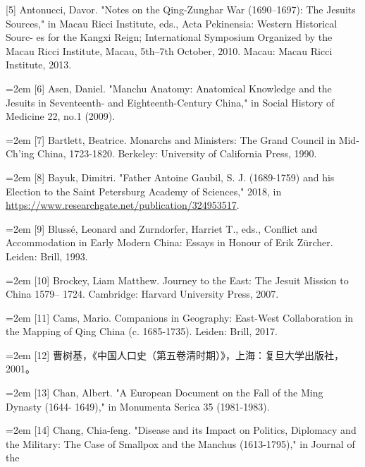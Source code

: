 [5] Antonucci, Davor. "Notes on the Qing-Zunghar War (1690–1697): The Jesuits%
\space%
Sources," in Macau Ricci Institute, eds., Acta Pekinensia: Western Historical Sourc-%
es for the Kangxi Reign; International Symposium Organized by the Macau Ricci%
\space%
Institute, Macau, 5th–7th October, 2010. Macau: Macau Ricci Institute, 2013.%
\par
\noindent\hangindent=2em
[6] Asen, Daniel. "Manchu Anatomy: Anatomical Knowledge and the Jesuits in%
\space%
Seventeenth- and Eighteenth-Century China," in Social History of Medicine 22,%
\space%
no.1 (2009).%
\par
\noindent\hangindent=2em
[7] Bartlett, Beatrice. Monarchs and Ministers: The Grand Council in Mid-Ch'ing%
\space%
China, 1723-1820. Berkeley: University of California Press, 1990.%
\par
\noindent\hangindent=2em
[8] Bayuk, Dimitri. "Father Antoine Gaubil, S. J. (1689-1759) and his Election to%
\space%
the Saint Petersburg Academy of Sciences," 2018, in \url{https://www.researchgate.net/publication/324953517}.%
\par
\noindent\hangindent=2em
[9] Blussé, Leonard and Zurndorfer, Harriet T., eds., Conflict and Accommodation in%
\space%
Early Modern China: Essays in Honour of Erik Zürcher. Leiden: Brill, 1993.%
\par
\noindent\hangindent=2em
[10] Brockey, Liam Matthew. Journey to the East: The Jesuit Mission to China 1579–%
1724. Cambridge: Harvard University Press, 2007.%
\par
\noindent\hangindent=2em
[11] Cams, Mario. Companions in Geography: East-West Collaboration in the Mapping%
\space%
of Qing China (c. 1685-1735). Leiden: Brill, 2017.%
\par
\noindent\hangindent=2em
[12] 曹树基，《中国人口史（第五卷清时期）》，上海：复旦大学出版社，2001。%
\par
\noindent\hangindent=2em
[13] Chan, Albert. "A European Document on the Fall of the Ming Dynasty (1644-%
1649)," in Monumenta Serica 35 (1981-1983).%
\par
\noindent\hangindent=2em
[14] Chang, Chia-feng. "Disease and its Impact on Politics, Diplomacy and the%
\space%
Military: The Case of Smallpox and the Manchus (1613-1795)," in Journal of the%
